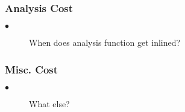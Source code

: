 \subsubsection{Analysis Cost}
\begin{description}
  \item[$\bullet$] When does analysis function get inlined?
\end{description}
\subsubsection{Misc. Cost}
\begin{description}
  \item[$\bullet$] What else?
\end{description}
